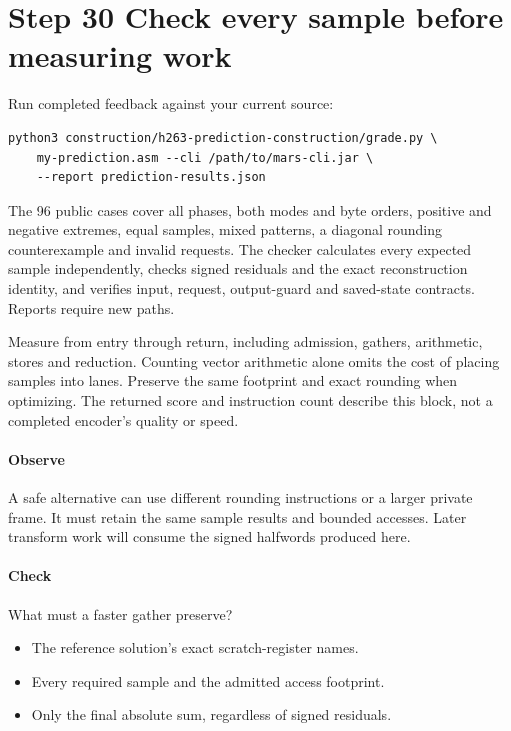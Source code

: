 \section{Step 30 Check every sample before measuring work}\label{h263-prediction-s10}
Run completed feedback against your current source:
\begin{verbatim}
python3 construction/h263-prediction-construction/grade.py \
    my-prediction.asm --cli /path/to/mars-cli.jar \
    --report prediction-results.json
\end{verbatim}
The 96 public cases cover all phases, both modes and byte orders, positive and
negative extremes, equal samples, mixed patterns, a diagonal rounding counterexample
and invalid requests. The checker calculates every expected sample independently,
checks signed residuals and the exact reconstruction identity, and verifies input,
request, output-guard and saved-state contracts. Reports require new paths.

Measure from entry through return, including admission, gathers, arithmetic,
stores and reduction. Counting vector arithmetic alone omits the cost of placing
samples into lanes. Preserve the same footprint and exact rounding when optimizing.
The returned score and instruction count describe this block, not a completed
encoder's quality or speed.

\paragraph{Observe} A safe alternative can use different rounding instructions
or a larger private frame. It must retain the same sample results and bounded
accesses. Later transform work will consume the signed halfwords produced here.
\Needspace{8\baselineskip}
\paragraph{Check} What must a faster gather preserve?
\begin{itemize}
  \item[A.] The reference solution's exact scratch-register names.
  \item[B.] Every required sample and the admitted access footprint.
  \item[C.] Only the final absolute sum, regardless of signed residuals.
\end{itemize}

